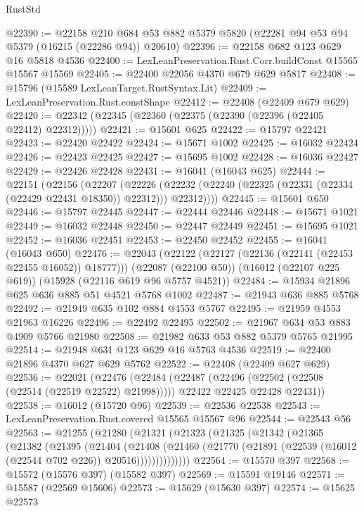 \begin{lexlean}{RustStd}
\begin{coremodule}
@22390 := @22158
    @210
    @684
    @53
    @882
    @5379
    @5820
    (@22281 @94 @53 @94 @5379 (@16215 (@22286 @94)) @20610)
@22396 := @22158 @682 @123 @629 @16 @5818 @4536
@22400 := LexLeanPreservation.Rust.Corr.buildConst @15565 @15567 @15569
@22405 := @22400 @22056 @4370 @679 @629 @5817
@22408 := @15796 (@15589 LexLeanTarget.RustSyntax.Lit)
@22409 := LexLeanPreservation.Rust.constShape
@22412 := @22408 (@22409 @679 @629)
@22420 := @22342 (@22345 (@22360 (@22375 (@22390 (@22396 (@22405 @22412) @22312)))))
@22421 := @15601 @625
@22422 := @15797 @22421
@22423 := @22420 @22422
@22424 := @15671 @1002
@22425 := @16032 @22424
@22426 := @22423 @22425
@22427 := @15695 @1002
@22428 := @16036 @22427
@22429 := @22426 @22428
@22431 := @16041 (@16043 @625)
@22444 := @22151
    (@22156
      (@22207
        (@22226 (@22232 (@22240 (@22325 (@22331 (@22334 (@22429 @22431 @18350)) @22312))) @22312))))
@22445 := @15601 @650
@22446 := @15797 @22445
@22447 := @22444 @22446
@22448 := @15671 @1021
@22449 := @16032 @22448
@22450 := @22447 @22449
@22451 := @15695 @1021
@22452 := @16036 @22451
@22453 := @22450 @22452
@22455 := @16041 (@16043 @650)
@22476 := @22043
    (@22122 (@22127 (@22136 (@22141 (@22453 @22455 @16052)) @18777)))
    (@22087 (@22100 @50))
    (@16012 (@22107 @225 @619))
    (@15928 (@22116 @619 @96 @5757 @4521))
@22484 := @15934 @21896 @625 @636 @885 @51 @4521 @5768 @1002
@22487 := @21943 @636 @885 @5768
@22492 := @21949 @635 @102 @884 @4553 @5767
@22495 := @21959 @4553 @21963 @16226
@22496 := @22492 @22495
@22502 := @21967 @634 @53 @883 @4909 @5766 @21980
@22508 := @21982 @633 @53 @882 @5379 @5765 @21995
@22514 := @21948 @631 @123 @629 @16 @5763 @4536
@22519 := @22400 @21896 @4370 @627 @629 @5762
@22522 := @22408 (@22409 @627 @629)
@22536 := @22021
    (@22476
      (@22484
        (@22487 (@22496 (@22502 (@22508 (@22514 (@22519 @22522) @21998)))))
        @22422
        @22425
        @22428
        @22431))
@22538 := @16012 (@15720 @96)
@22539 := @22536 @22538
@22543 := LexLeanPreservation.Rust.covered @15565 @15567 @96
@22544 := @22543 @56
@22563 := @21255
    (@21280
      (@21321
        (@21323
          (@21325
            (@21342
              (@21365
                (@21382
                  (@21395
                    (@21404
                      (@21408
                        (@21460
                          (@21770 (@21891 (@22539 (@16012 (@22544 @702 @226)) @20516))))))))))))))
@22564 := @15570 @397
@22568 := @15572 (@15576 @397) (@15582 @397)
@22569 := @15591 @19146
@22571 := @15587 (@22569 @15606)
@22573 := @15629 (@15630 @397)
@22574 := @15625 @22573

\end{coremodule}
\end{lexlean}
